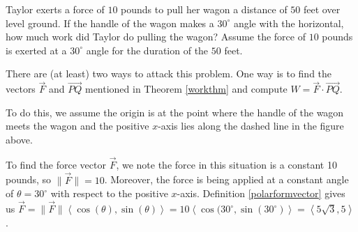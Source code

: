 \documentclass{ximera}
\begin{document}
\begin{example}  \label{vectorworkex} Taylor exerts a force of $10$ pounds to pull her wagon a distance of $50$ feet over level ground.  If the handle of the wagon makes a $30^{\circ}$ angle with the horizontal, how much work did Taylor do pulling the wagon? Assume  the force of $10$ pounds is exerted at a $30^{\circ}$ angle for the duration of the $50$ feet.

\begin{center}
\end{center}

\begin{explanation}
There are (at least) two ways to attack this problem.  One way is to find the vectors $\overrightarrow{F}$ and $\overrightarrow{PQ}$ mentioned in Theorem \ref{workthm} and compute $W = \overrightarrow{F} \cdot \overrightarrow{PQ}$.  

 

To do this, we assume the origin is at the point where the handle of the wagon meets the wagon and the positive $x$-axis lies along the dashed line in the figure above. 
 

 To find the force vector $\overrightarrow{F}$, we note the force in this situation is a constant 10 pounds, so  $\|\overrightarrow{F}\| = 10$.   Moreover, the force  is being applied at a constant angle of $\theta = 30^{\circ}$ with respect to the positive $x$-axis.    Definition \ref{polarformvector} gives us $\overrightarrow{F} = \| \overrightarrow{F} \| \left< \cos(\theta), \sin(\theta) \right> = 10 \left<\cos(30^{\circ}, \sin(30^{\circ})\right> = \left<5\sqrt{3}, 5\right>$.


\end{explanation}
\end{example}
\end{document}
